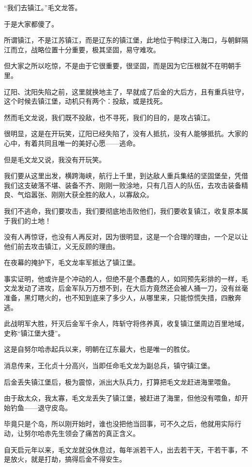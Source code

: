 \begin{multicols}{\theparacolNo}
“我们去镇江。”毛文龙答。

于是大家都傻了。

所谓镇江，不是江苏镇江，而是辽东的镇江堡，此地位于鸭绿江入海口，与朝鲜隔江而立，战略位置十分重要，极其坚固，易守难攻。

但大家之所以吃惊，不是由于它很重要，很坚固，而是因为它压根就不在明朝手里。

辽阳、沈阳失陷之前，这里就换地主了，早就成了后金的大后方，且有重兵驻守，这个时候去镇江堡，动机只有两个：投敌，或是找死。

然而毛文龙说，我们既不投敌，也不寻死，我们的目的，是攻占镇江。

很明显，这是在开玩笑，辽阳已经失陷了，没有人抵抗，没有人能够抵抗。大家的心中，有着共同且唯一的美好心愿——逃命。

但是毛文龙又说，我没有开玩笑。

我们要从这里出发，横跨海峡，航行上千里，到达敌人重兵集结的坚固堡垒，凭借我们这支破落不堪、装备不齐、刚刚一败涂地，只有几百人的队伍，去攻击装备精良、气焰嚣张、刚刚大获全胜的敌人，以寡敌众。

我们不逃命，我们要攻击，我们要彻底地击败他们，我们要收复镇江，收复原本属于我们的土地！

没有人再惊讶，也没有人再反对，因为很明显，这是一个合理的理由，一个足以让他们前去攻击镇江，义无反顾的理由。

在夜幕的掩护下，毛文龙率军抵达了镇江堡。

事实证明，他或许是个冲动的人，但绝不是个愚蠢的人，如同预先彩排的一样，毛文龙发动了进攻，后金军队万万想不到，在大后方竟然还会被人捅一刀，没有丝毫准备，黑灯瞎火的，也不知到底来了多少人，从哪里来，只能惊慌失措，四散奔逃。

此战明军大胜，歼灭后金军千余人，阵斩守将佟养真，收复镇江堡周边百里地域，史称“镇江堡大捷”。

这是自努尔哈赤起兵以来，明朝在辽东最大，也是唯一的胜仗。

消息传来，王化贞十分高兴，当即任命毛文龙为副总兵，镇守镇江堡。

后金丢失镇江堡后，极为震惊，派出大队兵力，打算把毛文龙赶进海里喂鱼。

由于敌太众，我太寡，毛文龙丢失了镇江堡，被赶进了海里，但他没有喂鱼，却开始钓鱼——退守皮岛。

毕竟只是个岛，所以刚开始时，谁也没把他当回事，可不久之后，他就用实际行动，让努尔哈赤先生领会了痛苦的真正含义。

自天启元年以来，毛文龙就没休息过，每年派若干人，出去若干天，干若干事，不是放火，就是打劫，搞得后金不得安生。


\end{multicols}
